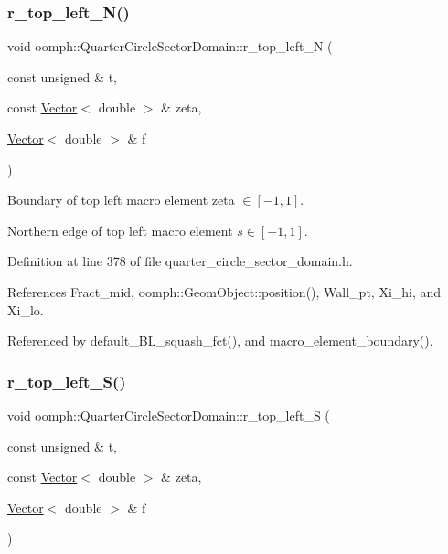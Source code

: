 \subsubsection{\texorpdfstring{r\+\_\+top\+\_\+left\+\_\+\+N()}{r\_top\_left\_N()}}
{\footnotesize\ttfamily void oomph\+::\+Quarter\+Circle\+Sector\+Domain\+::r\+\_\+top\+\_\+left\+\_\+N (\begin{DoxyParamCaption}\item[{const unsigned \&}]{t,  }\item[{const \hyperlink{classoomph_1_1Vector}{Vector}$<$ double $>$ \&}]{zeta,  }\item[{\hyperlink{classoomph_1_1Vector}{Vector}$<$ double $>$ \&}]{f }\end{DoxyParamCaption})\hspace{0.3cm}{\ttfamily [private]}}



Boundary of top left macro element zeta $ \in [-1,1] $. 

Northern edge of top left macro element $ s \in [-1,1] $. 

Definition at line 378 of file quarter\+\_\+circle\+\_\+sector\+\_\+domain.\+h.



References Fract\+\_\+mid, oomph\+::\+Geom\+Object\+::position(), Wall\+\_\+pt, Xi\+\_\+hi, and Xi\+\_\+lo.



Referenced by default\+\_\+\+B\+L\+\_\+squash\+\_\+fct(), and macro\+\_\+element\+\_\+boundary().

\mbox{\label{classoomph_1_1QuarterCircleSectorDomain_a0bb74af9c782bd0a0a8d3ccfd708af55}} 
\subsubsection{\texorpdfstring{r\+\_\+top\+\_\+left\+\_\+\+S()}{r\_top\_left\_S()}}
{\footnotesize\ttfamily void oomph\+::\+Quarter\+Circle\+Sector\+Domain\+::r\+\_\+top\+\_\+left\+\_\+S (\begin{DoxyParamCaption}\item[{const unsigned \&}]{t,  }\item[{const \hyperlink{classoomph_1_1Vector}{Vector}$<$ double $>$ \&}]{zeta,  }\item[{\hyperlink{classoomph_1_1Vector}{Vector}$<$ double $>$ \&}]{f }\end{DoxyParamCaption})\hspace{0.3cm}{\ttfamily [private]}}



